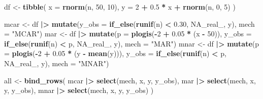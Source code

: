 \documentclass[
]{article}
\newenvironment{Shaded}{\begin{snugshade}}{\end{snugshade}}
\newcommand{\AttributeTok}[1]{\textcolor[rgb]{0.13,0.29,0.53}{#1}}
\newcommand{\ConstantTok}[1]{\textcolor[rgb]{0.56,0.35,0.01}{#1}}
\newcommand{\DecValTok}[1]{\textcolor[rgb]{0.00,0.00,0.81}{#1}}
\newcommand{\FloatTok}[1]{\textcolor[rgb]{0.00,0.00,0.81}{#1}}
\newcommand{\FunctionTok}[1]{\textcolor[rgb]{0.13,0.29,0.53}{\textbf{#1}}}
\newcommand{\NormalTok}[1]{#1}
\newcommand{\OtherTok}[1]{\textcolor[rgb]{0.56,0.35,0.01}{#1}}
\newcommand{\SpecialCharTok}[1]{\textcolor[rgb]{0.81,0.36,0.00}{\textbf{#1}}}
\newcommand{\StringTok}[1]{\textcolor[rgb]{0.31,0.60,0.02}{#1}}
\begin{document}
\begin{Shaded}
\begin{Highlighting}[]
\NormalTok{df }\OtherTok{\textless{}{-}} \FunctionTok{tibble}\NormalTok{(}
  \AttributeTok{x =} \FunctionTok{rnorm}\NormalTok{(n, }\DecValTok{50}\NormalTok{, }\DecValTok{10}\NormalTok{),}
  \AttributeTok{y =} \DecValTok{2} \SpecialCharTok{+} \FloatTok{0.5} \SpecialCharTok{*}\NormalTok{ x }\SpecialCharTok{+} \FunctionTok{rnorm}\NormalTok{(n, }\DecValTok{0}\NormalTok{, }\DecValTok{5}\NormalTok{)}
\NormalTok{)}

\NormalTok{mcar }\OtherTok{\textless{}{-}}\NormalTok{ df }\SpecialCharTok{|\textgreater{}} \FunctionTok{mutate}\NormalTok{(}\AttributeTok{y\_obs =} \FunctionTok{if\_else}\NormalTok{(}\FunctionTok{runif}\NormalTok{(n) }\SpecialCharTok{\textless{}} \FloatTok{0.30}\NormalTok{, }\ConstantTok{NA\_real\_}\NormalTok{, y),}
                     \AttributeTok{mech  =} \StringTok{"MCAR"}\NormalTok{)}
\NormalTok{mar  }\OtherTok{\textless{}{-}}\NormalTok{ df }\SpecialCharTok{|\textgreater{}} \FunctionTok{mutate}\NormalTok{(}\AttributeTok{p =} \FunctionTok{plogis}\NormalTok{(}\SpecialCharTok{{-}}\DecValTok{2} \SpecialCharTok{+} \FloatTok{0.05} \SpecialCharTok{*}\NormalTok{ (x }\SpecialCharTok{{-}} \DecValTok{50}\NormalTok{)),}
                     \AttributeTok{y\_obs =} \FunctionTok{if\_else}\NormalTok{(}\FunctionTok{runif}\NormalTok{(n) }\SpecialCharTok{\textless{}}\NormalTok{ p, }\ConstantTok{NA\_real\_}\NormalTok{, y),}
                     \AttributeTok{mech  =} \StringTok{"MAR"}\NormalTok{)}
\NormalTok{mnar }\OtherTok{\textless{}{-}}\NormalTok{ df }\SpecialCharTok{|\textgreater{}} \FunctionTok{mutate}\NormalTok{(}\AttributeTok{p =} \FunctionTok{plogis}\NormalTok{(}\SpecialCharTok{{-}}\DecValTok{2} \SpecialCharTok{+} \FloatTok{0.05} \SpecialCharTok{*}\NormalTok{ (y }\SpecialCharTok{{-}} \FunctionTok{mean}\NormalTok{(y))),}
                     \AttributeTok{y\_obs =} \FunctionTok{if\_else}\NormalTok{(}\FunctionTok{runif}\NormalTok{(n) }\SpecialCharTok{\textless{}}\NormalTok{ p, }\ConstantTok{NA\_real\_}\NormalTok{, y),}
                     \AttributeTok{mech  =} \StringTok{"MNAR"}\NormalTok{)}

\NormalTok{all }\OtherTok{\textless{}{-}} \FunctionTok{bind\_rows}\NormalTok{(}
\NormalTok{  mcar }\SpecialCharTok{|\textgreater{}} \FunctionTok{select}\NormalTok{(mech, x, y, y\_obs),}
\NormalTok{  mar  }\SpecialCharTok{|\textgreater{}} \FunctionTok{select}\NormalTok{(mech, x, y, y\_obs),}
\NormalTok{  mnar }\SpecialCharTok{|\textgreater{}} \FunctionTok{select}\NormalTok{(mech, x, y, y\_obs)}
\NormalTok{)}


\end{Highlighting}
\end{Shaded}
\end{document}
